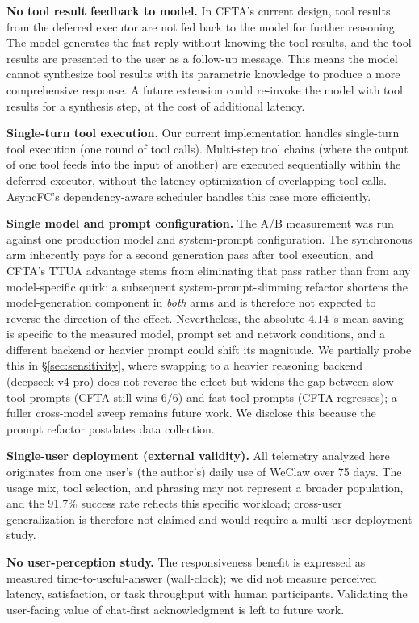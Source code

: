 \documentclass[numbered,mediumone,traditional]{oup-authoring-template}
\begin{document}
\textbf{No tool result feedback to model.} In CFTA's current design, tool results from the deferred executor are not fed back to the model for further reasoning. The model generates the fast reply without knowing the tool results, and the tool results are presented to the user as a follow-up message. This means the model cannot synthesize tool results with its parametric knowledge to produce a more comprehensive response. A future extension could re-invoke the model with tool results for a synthesis step, at the cost of additional latency.

\textbf{Single-turn tool execution.} Our current implementation handles single-turn tool execution (one round of tool calls). Multi-step tool chains (where the output of one tool feeds into the input of another) are executed sequentially within the deferred executor, without the latency optimization of overlapping tool calls. AsyncFC's dependency-aware scheduler handles this case more efficiently.

\textbf{Single model and prompt configuration.} The A/B measurement was run against one production model and system-prompt configuration. The synchronous arm inherently pays for a second generation pass after tool execution, and CFTA's TTUA advantage stems from eliminating that pass rather than from any model-specific quirk; a subsequent system-prompt-slimming refactor shortens the model-generation component in \emph{both} arms and is therefore not expected to reverse the direction of the effect. Nevertheless, the absolute $4.14$~s mean saving is specific to the measured model, prompt set and network conditions, and a different backend or heavier prompt could shift its magnitude. We partially probe this in \S\ref{sec:sensitivity}, where swapping to a heavier reasoning backend (deepseek-v4-pro) does not reverse the effect but widens the gap between slow-tool prompts (CFTA still wins $6/6$) and fast-tool prompts (CFTA regresses); a fuller cross-model sweep remains future work. We disclose this because the prompt refactor postdates data collection.

\textbf{Single-user deployment (external validity).} All telemetry analyzed here originates from one user's (the author's) daily use of WeClaw over 75 days. The usage mix, tool selection, and phrasing may not represent a broader population, and the 91.7\% success rate reflects this specific workload; cross-user generalization is therefore not claimed and would require a multi-user deployment study.

\textbf{No user-perception study.} The responsiveness benefit is expressed as measured time-to-useful-answer (wall-clock); we did not measure perceived latency, satisfaction, or task throughput with human participants. Validating the user-facing value of chat-first acknowledgment is left to future work.
\end{document}
